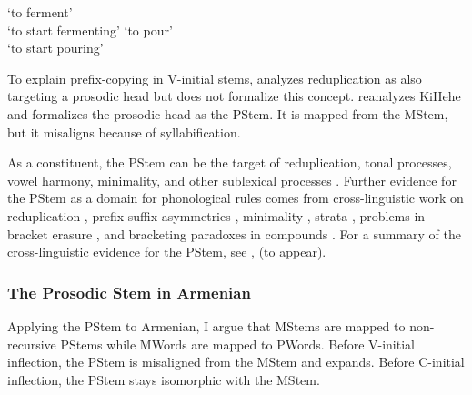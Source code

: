 \begin{exe}
	\ex 
	\begin{multicols}{2}
		\begin{xlist}
			\ex {}`to ferment'\label{nlttPaperkihehe c redpapergbbdff}\\
			`to start fermenting'
			\ex {}`to pour'\label{nlttPaperkihehe v redpapergbbdff}\\
			`to start pouring'
		\end{xlist}
		
	\end{multicols}
\end{exe}

To explain prefix-copying in V-initial stems, \citet{Aronoff-1988-HeadOperationsStrateRED} analyzes reduplication as also targeting a prosodic head but does not formalize this concept. \citet{Downing-1998-ProsodicMisalignmentReduplication} reanalyzes KiHehe and formalizes the prosodic head as the PStem. It is mapped from the MStem, but it misaligns because of syllabification.

As a constituent, the PStem can be the target of reduplication, tonal processes, vowel harmony, minimality, and other sublexical processes \citep{Downing-1998-ProsodicMisalignmentOnsetlessNLLT,Downing-1999-ProsodicStem,Downing-1999-VerbalRed3BantuLanguages}. Further evidence for the PStem as a domain for phonological rules comes from cross-linguistic work on reduplication \citep{FitzpatrickCole-1994-ProsodicHierarchyReduplication,InkelasZoll2005-MorphoDouble,Shaw-2005-NonAdjacencyRed}, prefix-suffix asymmetries \citep{Hyman-2008-DirectionalAsymmetries}, minimality \citep{Downing-2005-MorphoCompelexityProsodicMinimality,Downing-2006-CanonicalForms}, strata \citep{Inkelas-1989-ProsodicLexicon,Inkelas-1993-DerivingCyclicity}, problems in bracket erasure \citep{Inkelas-2014-Interplay}, and bracketing paradoxes in compounds \citep{Han-1995-ProsodicStructureCompounds}. For a summary of the cross-linguistic evidence for the PStem, see \citet{Downing-2006-CanonicalForms,Downing-2016-ProsodicLevelsChichewa}, \citeauthor{DowningKadenge-2020-ReplacingPStemProsodicHierarchy} (to appear).

\subsubsection{The Prosodic Stem in Armenian}\label{nlttPapersection: reduction: destressed reduction EA: pstem: apply}
Applying the PStem to Armenian, I argue that MStems are mapped to non-recursive PStems while MWords are mapped to PWords. Before V-initial inflection, the PStem is misaligned from the MStem and expands. Before C-initial inflection, the PStem stays isomorphic with the MStem.


